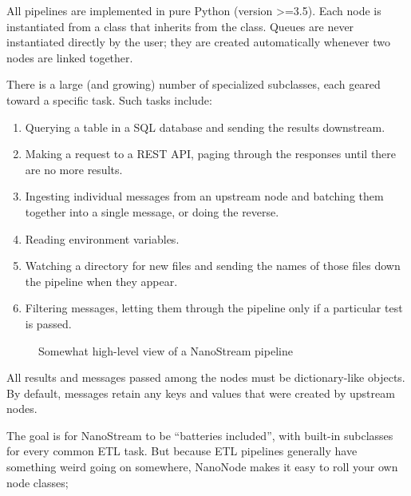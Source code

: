 \documentclass[letterpaper,10pt,english]{sphinxmanual}
\let\sphinxpxdimen\pdfpxdimen\else\newdimen\sphinxpxdimen
\begin{document}
All pipelines are implemented in pure Python (version \textgreater{}=3.5). Each node is
instantiated from a class that inherits from the  class. Queues
are never instantiated directly by the user; they are created automatically
whenever two nodes are linked together.

There is a large (and growing) number of specialized  subclasses,
each geared toward a specific task. Such tasks include:
\begin{enumerate}
\def\theenumi{\arabic{enumi}}
\def\labelenumi{\theenumi .}
\makeatletter\def\p@enumii{\p@enumi \theenumi .}\makeatother
\item {} 
Querying a table in a SQL database and sending the results downstream.

\item {} 
Making a request to a REST API, paging through the responses until there are
no more results.

\item {} 
Ingesting individual messages from an upstream node and batching them
together into a single message, or doing the reverse.

\item {} 
Reading environment variables.

\item {} 
Watching a directory for new files and sending the names of those files
down the pipeline when they appear.

\item {} 
Filtering messages, letting them through the pipeline only if a particular
test is passed.

\end{enumerate}

\begin{figure}[htbp]
\centering
\capstart

\noindent\sphinxincludegraphics[width=600\sphinxpxdimen]{{10k_view}.png}
\caption{Somewhat high-level view of a NanoStream pipeline}\label{\detokenize{treehorn:id2}}\end{figure}

All results and messages passed among the nodes must be dictionary-like
objects. By default, messages retain any keys and values that were created by upstream nodes.

The goal is for NanoStream to be “batteries included”, with built-in
 subclasses for every common ETL task. But because ETL pipelines
generally have something weird going on somewhere, NanoNode makes it easy to
roll your own node classes;
\end{document}

